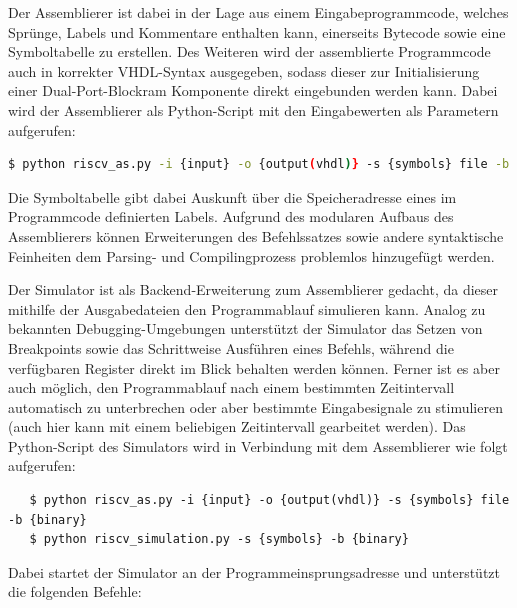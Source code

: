 
Der Assemblierer ist dabei in der Lage aus einem Eingabeprogrammcode, welches Spr\"unge, Labels und Kommentare enthalten kann, einerseits Bytecode sowie eine Symboltabelle zu erstellen. Des Weiteren wird der assemblierte Programmcode auch in korrekter VHDL-Syntax ausgegeben, sodass dieser zur Initialisierung einer Dual-Port-Blockram Komponente direkt eingebunden werden kann. Dabei wird der Assemblierer als Python-Script mit den Eingabewerten als Parametern aufgerufen:

\begin{lstlisting}[language=bash]
   $ python riscv_as.py -i {input} -o {output(vhdl)} -s {symbols} file -b {binary}
\end{lstlisting}

Die Symboltabelle gibt dabei Auskunft \"uber die Speicheradresse eines im Programmcode definierten Labels. Aufgrund des modularen Aufbaus des Assemblierers k\"onnen Erweiterungen des Befehlssatzes sowie andere syntaktische Feinheiten dem Parsing- und Compilingprozess problemlos hinzugef\"ugt werden.

 
Der Simulator ist als Backend-Erweiterung zum Assemblierer gedacht, da dieser mithilfe der Ausgabedateien den Programmablauf simulieren kann. Analog zu bekannten Debugging-Umgebungen unterst\"utzt der Simulator das Setzen von Breakpoints sowie das Schrittweise Ausf\"uhren eines Befehls, w\"ahrend die verf\"ugbaren Register direkt im Blick behalten werden k\"onnen. Ferner ist es aber auch m\"oglich, den Programmablauf nach einem bestimmten Zeitintervall automatisch zu unterbrechen oder aber bestimmte Eingabesignale zu stimulieren (auch hier kann mit einem beliebigen Zeitintervall gearbeitet werden). Das Python-Script des Simulators wird in Verbindung mit dem Assemblierer wie folgt aufgerufen:

\begin{lstlisting}
   $ python riscv_as.py -i {input} -o {output(vhdl)} -s {symbols} file -b {binary}
   $ python riscv_simulation.py -s {symbols} -b {binary}
\end{lstlisting}

Dabei startet der Simulator an der Programmeinsprungsadresse und unterst\"utzt die folgenden Befehle:

